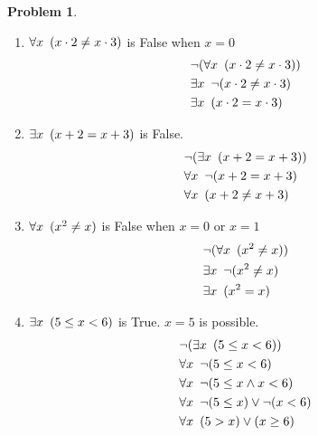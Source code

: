 \documentclass[11pt]{article}
\theoremstyle{definition}
\theoremstyle{case}
\theoremstyle{theorem}
\newtheorem{prob}{Problem}
\begin{document}
\begin{prob}\end{prob}
\begin{enumerate}[label=(\alph*)]
\item
$\forall x \hspace{5px} (x \cdot 2 \neq x \cdot 3)$ is False when $x = 0$ \\
\begin{align*}
  &\neg ( \forall x \hspace{5px} (x \cdot 2 \neq x \cdot 3) ) \\
  &\exists x \hspace{5px} \neg (x \cdot 2 \neq x \cdot 3) \\
  &\exists x \hspace{5px} (x \cdot 2 = x \cdot 3)
\end{align*}

\item
$\exists x \hspace{5px} (x + 2 = x + 3)$ is False. \\
\begin{align*}
  &\neg (\exists x \hspace{5px} (x + 2 = x + 3)) \\
  &\forall x \hspace{5px} \neg (x + 2 = x + 3) \\
  &\forall x \hspace{5px} (x + 2 \neq x + 3)
\end{align*}

\item
$\forall x \hspace{5px} (x^2 \neq x)$ is False when $x = 0$ or $x = 1$\\
\begin{align*}
  &\neg (\forall x \hspace{5px} (x^2 \neq x)) \\
  &\exists x \hspace{5px} \neg (x^2 \neq x) \\
  &\exists x \hspace{5px} (x^2 = x)
\end{align*}

\item
$\exists x \hspace{5px} (5 \leq x < 6)$ is True. $x = 5$ is possible. \\
\begin{align*}
  &\neg (\exists x \hspace{5px} (5 \leq x < 6)) \\
  &\forall x \hspace{5px} \neg (5 \leq x < 6) \\
  &\forall x \hspace{5px} \neg (5 \leq x \land x < 6) \\
  &\forall x \hspace{5px} \neg (5 \leq x) \lor \neg (x < 6) \\
  &\forall x \hspace{5px} (5 > x) \lor (x \geq 6)
\end{align*}

\end{enumerate}
\newpage
\end{document}
